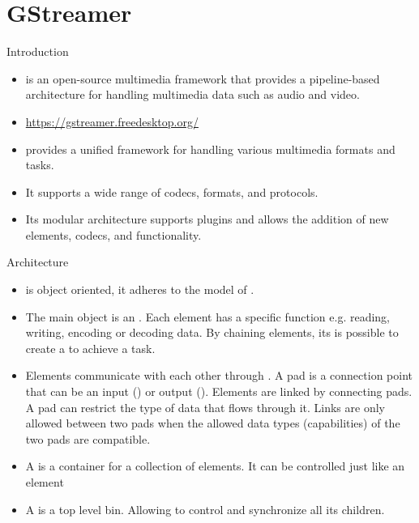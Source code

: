 \section{GStreamer}

\begin{frame}{Introduction}
  \begin{itemize}
  \item {} is an open-source multimedia framework that
    provides a pipeline-based architecture for handling multimedia
    data such as audio and video.
  \item \url{https://gstreamer.freedesktop.org/}
  \item {} provides a unified framework for handling
    various multimedia formats and tasks.
  \item It supports a wide range of codecs, formats, and protocols.
  \item Its modular architecture supports plugins and allows the
    addition of new elements, codecs, and functionality.
  \end{itemize}
\end{frame}

\begin{frame}{Architecture}
  \begin{itemize}
  \item {} is object oriented, it adheres to the
     model of .
  \item The main object is an . Each element has a
    specific function e.g. reading, writing, encoding or decoding
    data. By chaining elements, its is possible to create a
     to achieve a task.
  \item Elements communicate with each other through . A
    pad is a connection point that can be an input () or
    output (). Elements are linked by connecting pads. A
    pad can restrict the type of data that flows through it. Links are
    only allowed between two pads when the allowed data types
    (capabilities) of the two pads are compatible.
  \item A  is a container for a collection of elements. It
    can be controlled just like an element
  \item A  is a top level bin. Allowing to control and
    synchronize all its children.
  \end{itemize}
\end{frame}

